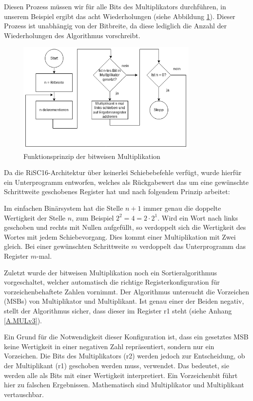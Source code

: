 \documentclass[fleqn, a4paper, 11pt]{article}       %
\begin{document}
\noindent Diesen Prozess müssen wir für alle Bits des Multiplikators durchführen, in unserem Beispiel ergibt das acht Wiederholungen (siehe Abbildung \ref{fig:bitw_Mul_Prinzip}). Dieser Prozess ist unabhängig von der Bitbreite, da diese lediglich die Anzahl der Wiederholungen des Algorithmus vorschreibt.



\begin{figure}[h]
    \includegraphics[width =0.8\textwidth]{bitweise_Mul_Prinzip.png}
\caption{Funktionsprinzip der bitweisen Multiplikation}
\label{fig:bitw_Mul_Prinzip}
\end{figure}



Da die RiSC16-Architektur über keinerlei Schiebebefehle verfügt, wurde hierfür ein Unterprogramm entworfen, welches als Rückgabewert das um eine gewünschte Schrittweite geschobenes Register hat und nach folgendem Prinzip arbeitet:

Im einfachen Binärsystem hat die Stelle $n+1$ immer genau die doppelte Wertigkeit der Stelle $n$, zum Beispiel $2^2 = 4 = 2 \cdot 2^1$. Wird ein Wort nach links geschoben und  rechts mit Nullen aufgefüllt, so verdoppelt sich die Wertigkeit des Wortes mit jedem Schiebevorgang. Dies kommt einer Multiplikation mit Zwei gleich. Bei einer gewünschten Schrittweite $m$ verdoppelt das Unterprogramm das Register  $m$-mal.

Zuletzt wurde der bitweisen Multiplikation noch ein Sortieralgorithmus vorgeschaltet, welcher automatisch die richtige Registerkonfiguration für vorzeichenbehaftete Zahlen vornimmt. Der Algorithmus untersucht die Vorzeichen (MSBs) von Multiplikator und Multiplikant. Ist genau einer der Beiden negativ, stellt der Algorithmus sicher, dass dieser im Register r1 steht (siehe Anhang \ref{A.MULv3}). 

 Ein Grund für die Notwendigkeit dieser Konfiguration ist, dass ein gesetztes MSB keine Wertigkeit in einer negativen  Zahl repräsentiert, sondern nur ein Vorzeichen. Die Bits des Multiplikators (r2) werden jedoch zur Entscheidung, ob der Multiplikant (r1) geschoben werden muss, verwendet. Das bedeutet, sie werden alle als Bits mit einer Wertigkeit interpretiert. Ein Vorzeichenbit führt hier zu falschen Ergebnissen. Mathematisch sind Multiplikator und Multiplikant vertauschbar.
\end{document}
